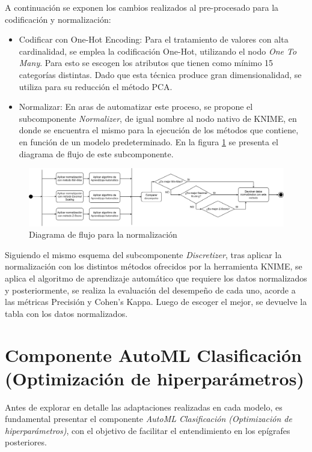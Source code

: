 A continuación se exponen los cambios realizados al pre-procesado para la codificación y normalización:

\begin{itemize}
	\item Codificar con One-Hot Encoding: Para el tratamiento de valores con alta cardinalidad, se emplea la codificación One-Hot, utilizando el nodo \textit{One To Many}. Para esto se escogen los atributos que tienen como mínimo 15 categorías distintas. Dado que esta técnica produce gran dimensionalidad, se utiliza para su reducción el método PCA.
	\item Normalizar: En aras de automatizar este proceso, se propone el subcomponente \textit{Normalizer}, de igual nombre al nodo nativo de KNIME, en donde se encuentra el mismo para la ejecución de los métodos que contiene, en función de un modelo predeterminado. En la figura \ref{fig:normalizacion} se presenta el diagrama de flujo de este subcomponente. 
\end{itemize}


\begin{figure}[H]
	\centering
	\includegraphics[width=1\linewidth]{"figuras/capi 2/preprocesado/normalizacion.drawio"}
	\caption{Diagrama de flujo para la normalización}
	\label{fig:normalizacion}
\end{figure}

Siguiendo el mismo esquema del subcomponente \textit{Discretizer}, tras aplicar la normalización con los distintos métodos ofrecidos por la herramienta KNIME, se aplica el algoritmo de aprendizaje automático que requiere los datos normalizados y posteriormente, se realiza la evaluación del desempeño de cada uno, acorde a las métricas Precisión y Cohen's Kappa. Luego de escoger el mejor, se devuelve la tabla con los datos normalizados.



\section{Componente AutoML Clasificación (Optimización de hiperparámetros)}
Antes de explorar en detalle las adaptaciones realizadas en cada modelo, es fundamental presentar el componente \textit{AutoML Clasificación (Optimización de hiperparámetros)}, con el objetivo de facilitar el entendimiento en los epígrafes posteriores. 

